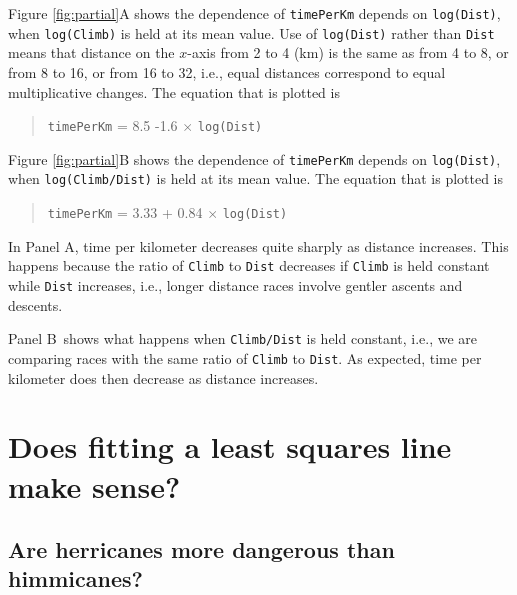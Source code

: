 \documentclass[
  10pt,
  b5paper]{book}
\begin{document}
Figure \ref{fig:partial}A shows the dependence of
\texttt{timePerKm} depends on \texttt{log(Dist)}, when \texttt{log(Climb)}
is held at its mean value. Use of \texttt{log(Dist)} rather than
\texttt{Dist} means that distance on the \(x\)-axis from 2 to 4 (km)
is the same as from 4 to 8, or from 8 to 16, or from 16 to 32,
i.e., equal distances correspond to equal multiplicative
changes. The equation that is plotted is

\begin{quote}
\texttt{timePerKm} = 8.5 -1.6 \(\times\) \texttt{log(Dist)}
\end{quote}

Figure \ref{fig:partial}B shows the dependence of
\texttt{timePerKm} depends on \texttt{log(Dist)}, when \texttt{log(Climb/Dist)}
is held at its mean value. The equation that is plotted is

\begin{quote}
\texttt{timePerKm} = 3.33 + 0.84 \(\times\) \texttt{log(Dist)}
\end{quote}

In Panel A, time per kilometer decreases quite sharply as distance
increases. This happens because the ratio of \texttt{Climb} to \texttt{Dist}
decreases if \texttt{Climb} is held constant while \texttt{Dist} increases,
i.e., longer distance races involve gentler ascents and descents.

Panel B~shows what happens when \texttt{Climb/Dist} is held
constant, i.e., we are comparing races with the same ratio of
\texttt{Climb} to \texttt{Dist}. As expected, time per kilometer does then
decrease as distance increases.

\hypertarget{does-fitting-a-least-squares-line-make-sense}{%
\section{Does fitting a least squares line make sense?}\label{does-fitting-a-least-squares-line-make-sense}}

\hypertarget{are-herricanes-more-dangerous-than-himmicanes}{%
\subsection*{Are herricanes more dangerous than himmicanes?}\label{are-herricanes-more-dangerous-than-himmicanes}}
\end{document}
